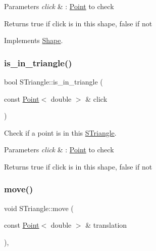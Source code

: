 \begin{DoxyParams}{Parameters}
{\em click} & \+: \hyperlink{classPoint}{Point} to check \\
\hline
\end{DoxyParams}
\begin{DoxyReturn}{Returns}
true if click is in this shape, false if not 
\end{DoxyReturn}


Implements \hyperlink{classShape_aa09a621da090e42840b4bec7ffb27620}{Shape}.

\mbox{\label{classSTriangle_a6824246f68484d8d8159a3315df257a4}} 
\subsubsection{\texorpdfstring{is\+\_\+in\+\_\+triangle()}{is\_in\_triangle()}}
{\footnotesize\ttfamily bool S\+Triangle\+::is\+\_\+in\+\_\+triangle (\begin{DoxyParamCaption}\item[{const \hyperlink{classPoint}{Point}$<$ double $>$ \&}]{click }\end{DoxyParamCaption})}



Check if a point is in this \hyperlink{classSTriangle}{S\+Triangle}. 


\begin{DoxyParams}{Parameters}
{\em click} & \+: \hyperlink{classPoint}{Point} to check \\
\hline
\end{DoxyParams}
\begin{DoxyReturn}{Returns}
true if click is in this shape, false if not 
\end{DoxyReturn}
\mbox{\label{classSTriangle_ac72888032cde56407193da9435e2fcc0}} 
\subsubsection{\texorpdfstring{move()}{move()}}
{\footnotesize\ttfamily void S\+Triangle\+::move (\begin{DoxyParamCaption}\item[{const \hyperlink{classPoint}{Point}$<$ double $>$ \&}]{translation }\end{DoxyParamCaption})\hspace{0.3cm}{\ttfamily [override]}, {\ttfamily [virtual]}}



